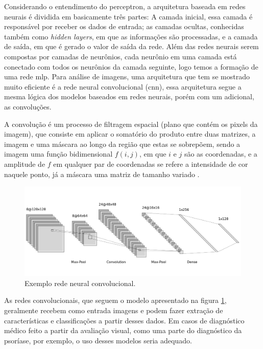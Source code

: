Considerando o entendimento do perceptron, a arquitetura baseada em redes neurais é dividida em basicamente três partes: A camada inicial, essa camada é responsável por receber os dados de entrada; as camadas ocultas, conhecidas também como \textit{hidden layers}, em que as informações são processadas, e a camada de saída, em que é gerado o valor de saída da rede. Além das redes neurais serem compostas por camadas de neurônios, cada neurônio em uma camada está conectado com todos os neurônios da camada seguinte, logo temos a formação de uma rede \gls{mlp}. Para análise de imagens, uma arquitetura que tem se mostrado muito eficiente é a rede neural convolucional (\gls{cnn}), essa arquitetura segue a mesma lógica dos modelos baseados em redes neurais, porém com um adicional, as convoluções. 

A convolução é um processo de filtragem espacial (plano que contém os pixels da imagem), que consiste em aplicar o somatório do produto entre duas matrizes, a imagem e uma máscara ao longo da região que estas se sobrepõem, sendo a imagem uma função bidimensional \( f(i,j)\), em que \(i\) e \(j\) são as coordenadas, e a amplitude de $f$ em qualquer par de coordenadas se refere a intensidade de cor naquele ponto, já a máscara uma matriz de tamanho variado \cite{gonzalez2008digital}. 

\begin{figure}[h]
    \centering
    \includegraphics[scale=0.4]{images/redeconv.png}
    \caption{Exemplo rede neural convolucional.}
    \label{fig: cnn}
\end{figure}


As redes convolucionais, que seguem o modelo apresentado na figura \ref{fig: cnn}, geralmente recebem como entrada imagens e podem fazer extração de características e classificações a partir desses dados. Em casos de diagnóstico médico feito a partir da avaliação visual, como uma parte do diagnóstico da psoríase, por exemplo, o uso desses modelos seria adequado.

